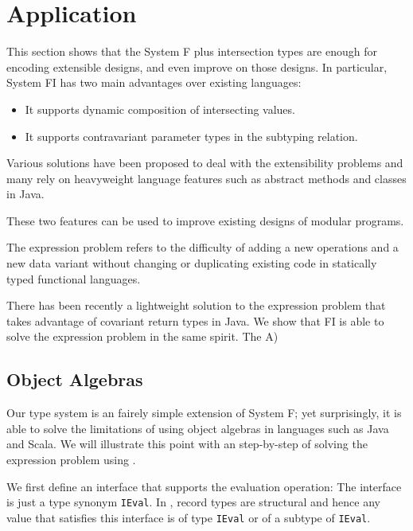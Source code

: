 \section{Application}



This section shows that the System F plus intersection types are enough
for encoding extensible designs, and even improve on those designs. In
particular, System FI has two main advantages over existing languages:

\begin{itemize}
\item It supports dynamic composition of intersecting values.
\item It supports contravariant parameter types in the subtyping relation.
\end{itemize}

Various solutions have been proposed to deal with the extensibility problems and
many rely on heavyweight language features such as abstract methods and classes
in Java.

These two features can be used to improve existing designs of modular programs.


The expression problem refers to the difficulty of adding a new operations and a
new data variant without changing or duplicating existing code in statically
typed functional languages.

There has been recently a lightweight solution to the expression problem that
takes advantage of covariant return types in Java. We show that FI is able to
solve the expression problem in the same spirit. The
A)

\subsection{Object Algebras}

Our type system is an fairely simple extension of System F; yet surprisingly, it
is able to solve the limitations of using object algebras in languages such as
Java and Scala. We will illustrate this point with an step-by-step of solving
the expression problem using \systemFI.

We first define an interface that supports the evaluation operation:
The interface is just a type synonym \lstinline{IEval}. In \systemFI, record
types are structural and hence any value that satisfies this interface is of
type \lstinline{IEval} or of a subtype of \lstinline{IEval}.

